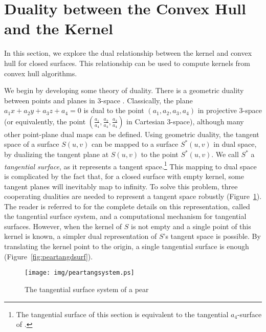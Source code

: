 \documentclass{elsart}
\begin{document}
\section{Duality between the Convex Hull and the Kernel}
\label{sec-dual}

In this section, we explore the dual relationship between the kernel and convex hull
for closed surfaces.
This relationship can be used to compute kernels from convex hull algorithms.


We begin by developing some theory of duality.
There is a geometric duality between points and planes in 3-space \cite{hartshorne}.
Classically, the plane $a_1x + a_2y + a_3z + a_4=0$ is dual to the point $(a_1,a_2,a_3,a_4)$ 
in projective 3-space 
(or equivalently, the point $(\frac{a_1}{a_4},\frac{a_2}{a_4},\frac{a_3}{a_4})$ in Cartesian 3-space),
although many other point-plane dual maps can be defined.
Using geometric duality, the tangent space of a surface $S(u,v)$ can be mapped 
to a surface $S^*(u,v)$ in dual space, by dualizing the tangent plane at $S(u,v)$ to the point $S^*(u,v)$.
We call $S^*$ a {\em tangential surface}, as it represents a tangent space.\footnote{The tangential surface
  of this section is equivalent to the tangential $a_4$-surface of \cite{jj03tangsurf}.}
This mapping to dual space is complicated by the fact that, for a closed surface with empty kernel,
some tangent planes will inevitably map to infinity.
To solve this problem, 
three cooperating dualities are needed to represent a tangent space robustly (Figure~\ref{fig:peartangsystem}).
The reader is referred to \cite{jj03tangsurf} for the complete details
on this representation, called the tangential surface system,
and a computational mechanism for tangential surfaces.
However, when the kernel of $S$ is not empty and a single point of this
kernel is known,
a simpler dual representation of $S$'s tangent space is possible.
By translating the kernel point to the origin,
a single tangential surface is enough (Figure~\ref{fig:peartangdsurf}).

\begin{figure}[h]
\begin{center}
\texttt{[image: img/peartangsystem.ps]}
\end{center}
\caption{The tangential surface system of a pear}
\label{fig:peartangsystem}
\vskip 0.2in
\end{figure}
\end{document}

